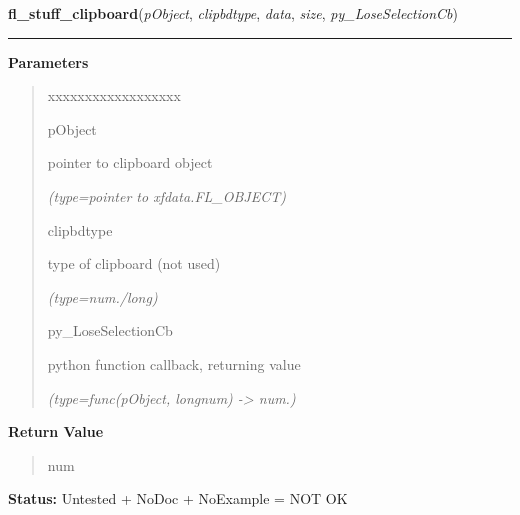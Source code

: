 \hspace{.8\funcindent}\begin{boxedminipage}{\funcwidth}

    \raggedright \textbf{fl\_stuff\_clipboard}(\textit{pObject}, \textit{clipbdtype}, \textit{data}, \textit{size}, \textit{py\_LoseSelectionCb})

    \vspace{-1.5ex}

    \rule{\textwidth}{0.5\fboxrule}
\setlength{\parskip}{2ex}
\setlength{\parskip}{1ex}
      \textbf{Parameters}
      \vspace{-1ex}

      \begin{quote}
        \begin{Ventry}{xxxxxxxxxxxxxxxxxx}

          \item[pObject]

          pointer to clipboard object

            {\it (type=pointer to xfdata.FL\_OBJECT)}

          \item[clipbdtype]

          type of clipboard (not used)

            {\it (type=num./long)}

          \item[py\_LoseSelectionCb]

          python function callback, returning value

            {\it (type=func(pObject, longnum) -{\textgreater} num.)}

        \end{Ventry}

      \end{quote}

      \textbf{Return Value}
    \vspace{-1ex}

      \begin{quote}
      num

      \end{quote}

\textbf{Status:} Untested + NoDoc + NoExample = NOT OK



    \end{boxedminipage}

    \label{xformslib:library:fl_request_clipboard}

